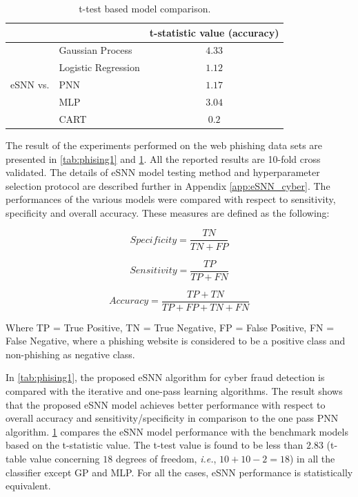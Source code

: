 \begin{table}
	\centering
	\caption{t-test based model comparison.}
	\label{tab:phising2}

	\begin{tabular}{@{}llc@{}}
		\toprule \toprule
		 &  & t-statistic value (accuracy) \\ \midrule
		\multirow{5}{*}{eSNN vs.} & Gaussian Process & $4.33$ \\
		& Logistic Regression & $1.12$ \\
		& PNN & $1.17$ \\
		& MLP & $3.04$ \\
		& CART & $0.2$ \\ \bottomrule
	\end{tabular}
\end{table}

The result of the experiments performed on the web phishing data sets are presented in \tablenames \ref{tab:phising1} and \ref{tab:phising2}. All the reported results are 10-fold cross validated. The details of eSNN model testing method and hyperparameter selection protocol are described further in Appendix \ref{app:eSNN_cyber}. The performances of the various models were compared with respect to sensitivity, specificity and overall accuracy. These measures are defined as the following:

\begin{equation}
Specificity=\frac{TN}{TN+FP}
\end{equation}

\begin{equation}
Sensitivity=\frac{TP}{TP+FN}
\end{equation}

\begin{equation}
Accuracy=\frac{TP+TN}{TP+FP+TN+FN}
\end{equation}

Where TP = True Positive, TN = True Negative, FP = False Positive, FN = False Negative, where a phishing website is considered to be a positive class and non-phishing as negative class.

In \tablename \ref{tab:phising1}, the proposed eSNN algorithm for cyber fraud detection is compared with the iterative and one-pass learning algorithms. The result shows that the proposed eSNN model achieves better performance with respect to overall accuracy and sensitivity/specificity in comparison to the one pass PNN algorithm. \tablename \ref{tab:phising2} compares the eSNN model performance with the benchmark models based on the t-statistic value. The t-test value is found to be less than $2.83$ (t-table value concerning $18$ degrees of freedom, \emph{i.e.}, $10+10-2=18$) in all the classifier except GP and MLP. For all the cases, eSNN performance is statistically equivalent. 



